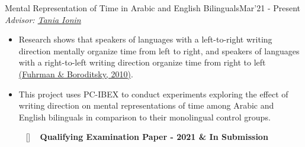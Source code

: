 \begin{projects}
     \project
	{Mental Representation of Time in Arabic and English Bilinguals}{Mar'21 - Present}
	{
	    \textit{Advisor:  \href{https://linguistics.illinois.edu/directory/profile/tionin}{Tania Ionin}}
	}
	{\begin{itemize}
	\setlength\itemsep{0.3em}
     \item Research shows that speakers of languages with a left-to-right writing direction mentally organize time from left to right, and speakers of languages with a right-to-left writing direction organize time from right to left \href{https://onlinelibrary.wiley.com/doi/full/10.1111/j.1551-6709.2010.01105.x}{(Fuhrman \& Boroditsky, 2010)}.
     \item{This project uses PC-IBEX to conduct experiments exploring the effect of writing direction on mental representations of time among Arabic and English bilinguals in comparison to their monolingual control groups.}
 
 ~ [\href{https://github.com/maimm2/PCIbexExperiments}{\small{\websiteSymbol}}] ~ {\small{\lbrack\textbf{{Qualifying Examination Paper - 2021 \& In Submission}}\rbrack}}
     \end{itemize}}
\end{projects}    
\vspace{-3mm}

